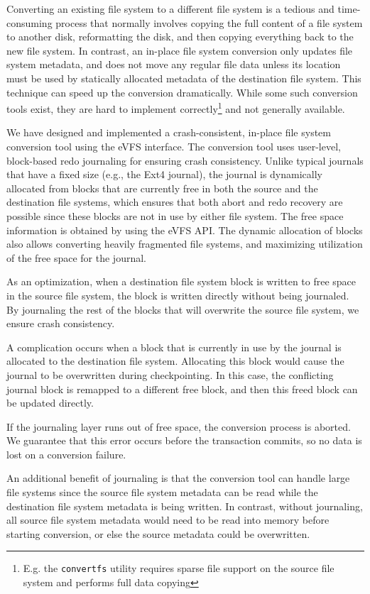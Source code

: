 Converting an existing file system to a different file system is a tedious and time-consuming process that normally involves copying the full content of a file system to another disk, reformatting the disk, and then copying everything back to the new file system. In contrast, an in-place file system conversion only updates file system metadata, and does not move any regular file data unless its location must be used by statically allocated metadata of the destination file system. This technique can speed up the conversion dramatically. While some such conversion tools exist, they are hard to implement correctly\footnote{E.g. the \texttt{convertfs} utility \cite{convertfs} requires sparse file support on the source file system and performs full data copying} and not generally available.

We have designed and implemented a crash-consistent, in-place file system conversion tool using the eVFS interface. The conversion tool uses user-level, block-based redo journaling for ensuring crash consistency. Unlike typical journals that have a fixed size (e.g., the Ext4 journal), the journal is dynamically allocated from blocks that are currently free in both the source and the destination file systems, which ensures that both abort and redo recovery are possible since these blocks are not in use by either file system. The free space information is obtained by using the eVFS API. The dynamic allocation of blocks also allows converting heavily fragmented file systems, and maximizing utilization of the free space for the journal.

As an optimization, when a destination file system block is written to free space in the source file system, the block is written directly without being journaled. By journaling the rest of the blocks that will overwrite the source file system, we ensure crash consistency.

A complication occurs when a block that is currently in use by the journal is allocated to the destination file system. Allocating this block would cause the journal to be overwritten during checkpointing. In this case, the conflicting journal block is remapped to a different free block, and then this freed block can be updated directly.

If the journaling layer runs out of free space, the conversion process is aborted. We guarantee that this error occurs before the transaction commits, so no data is lost on a conversion failure.

An additional benefit of journaling is that the conversion tool can handle large file systems since the source file system metadata can be read while the destination file system metadata is being written. In contrast, without journaling, all source file system metadata would need to be read into memory before starting conversion, or else the source metadata could be overwritten.

